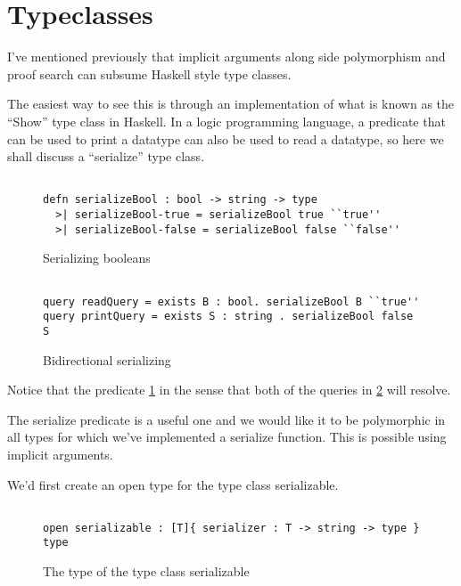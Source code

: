 \section{Typeclasses}


I've mentioned previously that implicit arguments along side polymorphism and proof search can subsume Haskell style type classes.

The easiest way to see this is through an implementation of what is known as the ``Show'' type class in Haskell.  
In a logic programming language, a predicate that can be used to print a datatype can also be used to read a datatype, so here we shall discuss a ``serialize'' type class.


\begin{figure}[H]
\begin{lstlisting}

defn serializeBool : bool -> string -> type
  >| serializeBool-true = serializeBool true ``true''
  >| serializeBool-false = serializeBool false ``false''

\end{lstlisting}
\caption{Serializing booleans}
\label{prog:serializing}
\end{figure}



\begin{figure}[H]
\begin{lstlisting}

query readQuery = exists B : bool. serializeBool B ``true''
query printQuery = exists S : string . serializeBool false S

\end{lstlisting}
\caption{Bidirectional serializing}
\label{prog:bidi}
\end{figure}

Notice that the predicate \ref{prog:serializing} in the sense that both of the queries in 
\ref{prog:bidi} will resolve. 

The serialize predicate is a useful one and we would like it to be polymorphic in all types for which we've implemented a serialize function.  This is possible using implicit arguments.

We'd first create an open type for the type class serializable.

\begin{figure}[H]
\begin{lstlisting}

open serializable : [T]{ serializer : T -> string -> type } type

\end{lstlisting}
\caption{The type of the type class serializable }
\label{prog:sty}
\end{figure}


